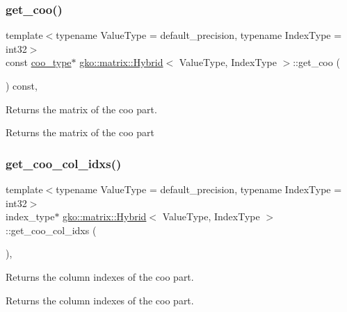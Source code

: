 \subsubsection{\texorpdfstring{get\+\_\+coo()}{get\_coo()}}
{\footnotesize\ttfamily template$<$typename Value\+Type = default\+\_\+precision, typename Index\+Type = int32$>$ \\
const \hyperlink{classgko_1_1matrix_1_1Coo}{coo\+\_\+type}$\ast$ \hyperlink{classgko_1_1matrix_1_1Hybrid}{gko\+::matrix\+::\+Hybrid}$<$ Value\+Type, Index\+Type $>$\+::get\+\_\+coo (\begin{DoxyParamCaption}{ }\end{DoxyParamCaption}) const\hspace{0.3cm}{\ttfamily [inline]}, {\ttfamily [noexcept]}}



Returns the matrix of the coo part. 

\begin{DoxyReturn}{Returns}
the matrix of the coo part 
\end{DoxyReturn}
\mbox{\label{classgko_1_1matrix_1_1Hybrid_a327548f42867b201cd469f3a21145c87}} 
\subsubsection{\texorpdfstring{get\+\_\+coo\+\_\+col\+\_\+idxs()}{get\_coo\_col\_idxs()}}
{\footnotesize\ttfamily template$<$typename Value\+Type = default\+\_\+precision, typename Index\+Type = int32$>$ \\
index\+\_\+type$\ast$ \hyperlink{classgko_1_1matrix_1_1Hybrid}{gko\+::matrix\+::\+Hybrid}$<$ Value\+Type, Index\+Type $>$\+::get\+\_\+coo\+\_\+col\+\_\+idxs (\begin{DoxyParamCaption}{ }\end{DoxyParamCaption})\hspace{0.3cm}{\ttfamily [inline]}, {\ttfamily [noexcept]}}



Returns the column indexes of the coo part. 

\begin{DoxyReturn}{Returns}
the column indexes of the coo part. 
\end{DoxyReturn}
\mbox{\label{classgko_1_1matrix_1_1Hybrid_a2fe06adb3323dcad710329e33a12dff4}} 
